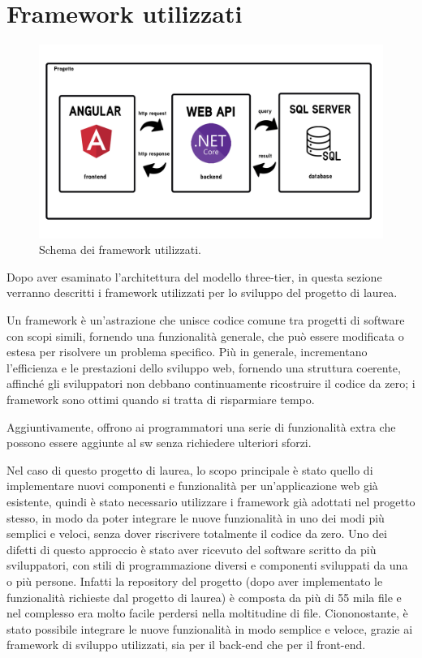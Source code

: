 \newpage
\section{Framework utilizzati}\label{sec:Framework}
\begin{figure}[H]
\centering
\includegraphics[width=1\textwidth]{Images/architettura.png}
\caption{\label{fig:arch}Schema dei \gls{framework} utilizzati.}
\end{figure}
Dopo aver esaminato l'architettura del modello three-tier, in questa sezione verranno descritti i \gls{framework} utilizzati per lo sviluppo del progetto di laurea.\newline

Un \gls{framework} è un'astrazione che unisce codice comune tra progetti di software con scopi simili, fornendo una funzionalità generale, che può essere modificata o estesa per risolvere un problema specifico.
Più in generale, incrementano l'efficienza e le prestazioni dello sviluppo web, fornendo una struttura coerente, affinché gli sviluppatori non debbano continuamente ricostruire il codice da zero; i \gls{framework} sono ottimi quando si tratta di risparmiare tempo. 

Aggiuntivamente, offrono ai programmatori una serie di funzionalità extra che possono essere aggiunte al \acrlong{sw} senza richiedere ulteriori sforzi.\newline

Nel caso di questo progetto di laurea, lo scopo principale è stato quello di implementare nuovi componenti e funzionalità per un'applicazione web già esistente, quindi è stato necessario utilizzare i \gls{framework} già adottati nel progetto stesso, in modo da poter integrare le nuove funzionalità in uno dei modi più semplici e veloci, senza dover riscrivere totalmente il codice da zero. Uno dei difetti di questo approccio è stato aver ricevuto del software scritto da più sviluppatori, con stili di programmazione diversi e componenti sviluppati da una o più persone. Infatti la repository del progetto (dopo aver implementato le funzionalità richieste dal progetto di laurea) è composta da più di 55 mila file e nel complesso era molto facile perdersi nella moltitudine di file.
Ciononostante, è stato possibile integrare le nuove funzionalità in modo semplice e veloce, grazie ai \gls{framework} di sviluppo utilizzati, sia per il back-end che per il front-end.

